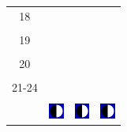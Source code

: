 \documentclass[a4paper,12pt, tikz]{scrartcl}
\begin{document}
\begin{tabularx}{\linewidth}{|c|X|X|X|}
      \hline
      18&   &       &    \\
        &   &       &    \\
      \hline
      19&   &       &    \\
        &   &       &    \\
      \hline
      20&   &       &    \\
        &   &       &    \\
      \hline
      21-24&   &       &    \\
        &   &       &    \\
      \hline  
      & \vspace{0.01cm} \centerline{\includegraphics[width=0.5cm]{moon_phases/Moon_phase_2.svg.png}} \vspace{0.1cm} & \vspace{0.01cm} \centerline{\includegraphics[width=0.5cm]{moon_phases/Moon_phase_2.svg.png}} \vspace{0.1cm} & \vspace{0.01cm} \centerline{\includegraphics[width=0.5cm]{moon_phases/Moon_phase_2.svg.png}} \vspace{0.1cm}\\
      \hline   
    \end{tabularx}




    \newpage

        \noindent
\end{document}
